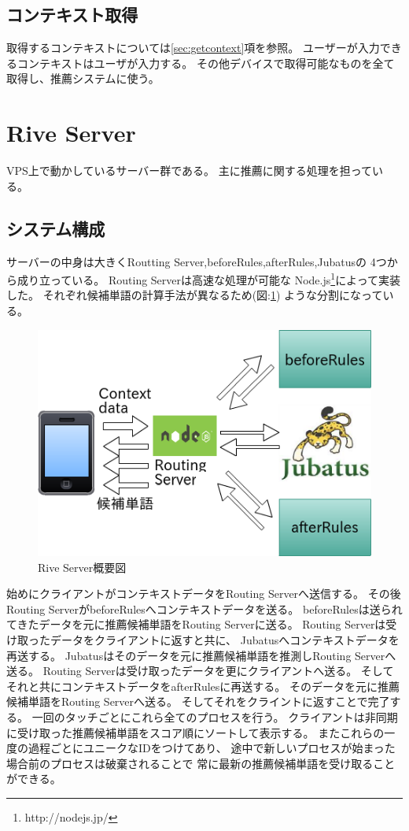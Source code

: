 \subsection{コンテキスト取得}
取得するコンテキストについては\ref{sec:getcontext}項を参照。
ユーザーが入力できるコンテキストはユーザが入力する。
その他デバイスで取得可能なものを全て取得し、推薦システムに使う。

\section{Rive Server}
\label{sec:riveserver}
VPS上で動かしているサーバー群である。
主に推薦に関する処理を担っている。

\subsection{システム構成}
サーバーの中身は大きくRoutting Server,beforeRules,afterRules,Jubatusの
4つから成り立っている。
Routing Serverは高速な処理が可能な
Node.js\footnote{http://nodejs.jp/}によって実装した。
それぞれ候補単語の計算手法が異なるため(図:\ref{fig:riveserver})
ような分割になっている。
\begin{figure}[htbp]
  \begin{center}
    \includegraphics[width=14cm,bb=0 0 466 316]{images/riveserver.png}
  \end{center}
  \caption{Rive Server概要図}
  \label{fig:riveserver}
\end{figure}
始めにクライアントがコンテキストデータをRouting Serverへ送信する。
その後Routing ServerがbeforeRulesへコンテキストデータを送る。
beforeRulesは送られてきたデータを元に推薦候補単語をRouting Serverに送る。
Routing Serverは受け取ったデータをクライアントに返すと共に、
Jubatusへコンテキストデータを再送する。
Jubatusはそのデータを元に推薦候補単語を推測しRouting Serverへ送る。
Routing Serverは受け取ったデータを更にクライアントへ送る。
そしてそれと共にコンテキストデータをafterRulesに再送する。
そのデータを元に推薦候補単語をRouting Serverへ送る。
そしてそれをクライントに返すことで完了する。
一回のタッチごとにこれら全てのプロセスを行う。
クライアントは非同期に受け取った推薦候補単語をスコア順にソートして表示する。
またこれらの一度の過程ごとにユニークなIDをつけてあり、
途中で新しいプロセスが始まった場合前のプロセスは破棄されることで
常に最新の推薦候補単語を受け取ることができる。

